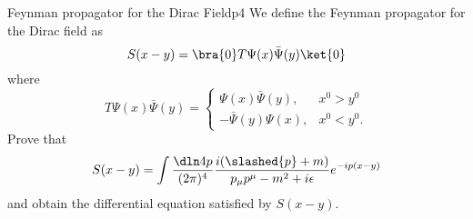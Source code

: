\begin{problem}{Feynman propagator for the Dirac Field}{p4}
    We define the Feynman propagator for the Dirac field as
    \begin{equation*}
       S(x - y) = \bra{0} T\Psi(x) \bar{\Psi}(y) \ket{0}
    \end{equation*}
    where
    \begin{equation*}
        T\Psi(x) \bar{\Psi}(y) = \begin{cases}
           \Psi(x) \bar{\Psi}(y), & x^0 > y^0\\
           -\bar{\Psi}(y) \Psi(x), & x^0 < y^0.
        \end{cases}
    \end{equation*}
    Prove that
    \begin{equation*}
       S(x - y) = \int \frac{\dln4p}{(2\pi)^4} \frac{i(\slashed{p} + m)}{p_\mu p^\mu - m^2 + i \epsilon}e^{-i p(x - y)}
    \end{equation*}
    and obtain the differential equation satisfied by \(S(x - y).\) 
\end{problem}

